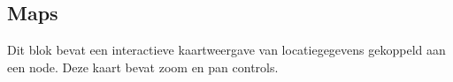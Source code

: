 \subsection{Maps}
\label{sec:maps}
Dit blok bevat een interactieve kaartweergave van locatiegegevens gekoppeld aan een node. Deze kaart bevat zoom en pan controls.